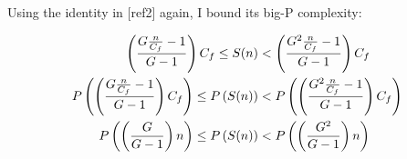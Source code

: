 Using the identity in [ref2] again, I bound its big-P complexity:

\begin{align*}
\left( \frac{G \frac{n}{C_f} - 1}{G - 1} \right) C_f \leq S(n) &< \left( \frac{G^2 \frac{n}{C_f} - 1}{G - 1} \right) C_f\\
P\left( \left( \frac{G \frac{n}{C_f} - 1}{G - 1} \right) C_f \right) \leq P\left( S(n) \right) &< P\left( \left( \frac{G^2 \frac{n}{C_f} - 1}{G - 1} \right) C_f \right)\\
P\left( \left( \frac{G}{G - 1} \right) n \right) \leq P\left( S(n) \right) &< P\left( \left( \frac{G^2}{G - 1} \right) n \right)
\end{align*}